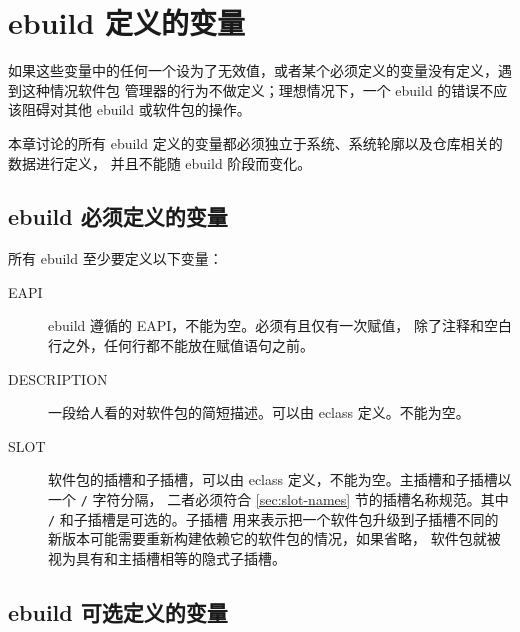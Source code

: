 \chapter{ebuild 定义的变量}
\label{ch:ebuild-vars}


如果这些变量中的任何一个设为了无效值，或者某个必须定义的变量没有定义，遇到这种情况软件包
管理器的行为不做定义；理想情况下，一个 ebuild 的错误不应该阻碍对其他 ebuild 或软件包的操作。

本章讨论的所有 ebuild 定义的变量都必须独立于系统、系统轮廓以及仓库相关的数据进行定义，
并且不能随 ebuild 阶段而变化。

\section{ebuild 必须定义的变量}
\label{sec:mandatory-vars}

所有 ebuild 至少要定义以下变量：
\begin{description}
\item[EAPI] ebuild 遵循的 EAPI，不能为空。必须有且仅有一次赋值，
    除了注释和空白行之外，任何行都不能放在赋值语句之前。
\item[DESCRIPTION] 一段给人看的对软件包的简短描述。可以由 eclass 定义。不能为空。
\item[SLOT] 软件包的插槽和子插槽，可以由 eclass 定义，不能为空。主插槽和子插槽以一个 \texttt{/} 字符分隔，
    二者必须符合 \ref{sec:slot-names} 节的插槽名称规范。其中 \texttt{/} 和子插槽是可选的。子插槽
    用来表示把一个软件包升级到子插槽不同的新版本可能需要重新构建依赖它的软件包的情况，如果省略，
    软件包就被视为具有和主插槽相等的隐式子插槽。
\end{description}

\section{ebuild 可选定义的变量}
\label{sec:optional-vars}

